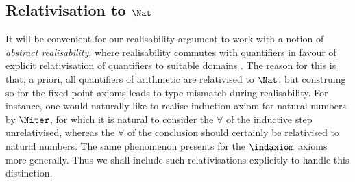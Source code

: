 

\subsection{Relativisation to $\Nat$}
It will be convenient for our realisability argument to work with a notion of \emph{abstract realisability}, where realisability commutes with quantifiers in favour of explicit relativisation of quantifiers to suitable domains \cite{Troelstra98:realizability-handbook}.
The reason for this is that, a priori, all quantifiers of arithmetic are relativised to $\Nat$, but construing so for the fixed point axioms leads to type mismatch during realisability.
For instance, one would naturally like to realise induction axiom for natural numbers by $\Niter$, for which it is natural to consider the $\forall$ of the inductive step unrelativised, whereas the $\forall$ of the conclusion should certainly be relativised to natural numbers.
The same phenomenon presents for the $\indaxiom$ axioms more generally. 
Thus we shall include such relativisations explicitly to handle this distinction.

